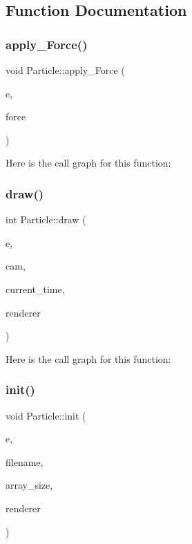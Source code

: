 \subsection{Function Documentation}
\mbox{\label{namespace_particle_a6798a62b449214a798708e7e05855933}} 
\subsubsection{\texorpdfstring{apply\+\_\+\+Force()}{apply\_Force()}}
{\footnotesize\ttfamily void Particle\+::apply\+\_\+\+Force (\begin{DoxyParamCaption}\item[{\mbox{\hyperlink{struct_particle_1_1_emitter}{Emitter}} $\ast$}]{e,  }\item[{const \mbox{\hyperlink{struct_vec2_d_1_1_vec2_d}{Vec2\+D\+::\+Vec2D}} $\ast$}]{force }\end{DoxyParamCaption})}

Here is the call graph for this function\+:
\mbox{\label{namespace_particle_aee79b4d9aa717789373fbb4ee87fe062}} 
\subsubsection{\texorpdfstring{draw()}{draw()}}
{\footnotesize\ttfamily int Particle\+::draw (\begin{DoxyParamCaption}\item[{\mbox{\hyperlink{struct_particle_1_1_emitter}{Emitter}} $\ast$}]{e,  }\item[{const \mbox{\hyperlink{struct_grid___camera_1_1_grid___camera}{Grid\+\_\+\+Camera\+::\+Grid\+\_\+\+Camera}} $\ast$}]{cam,  }\item[{unsigned int}]{current\+\_\+time,  }\item[{S\+D\+L\+\_\+\+Renderer $\ast$}]{renderer }\end{DoxyParamCaption})}

Here is the call graph for this function\+:
\mbox{\label{namespace_particle_adc41f88d0e886694850badfb2a50c914}} 
\subsubsection{\texorpdfstring{init()}{init()}}
{\footnotesize\ttfamily void Particle\+::init (\begin{DoxyParamCaption}\item[{\mbox{\hyperlink{struct_particle_1_1_emitter}{Emitter}} $\ast$}]{e,  }\item[{const char $\ast$}]{filename,  }\item[{int}]{array\+\_\+size,  }\item[{S\+D\+L\+\_\+\+Renderer $\ast$}]{renderer }\end{DoxyParamCaption})}


